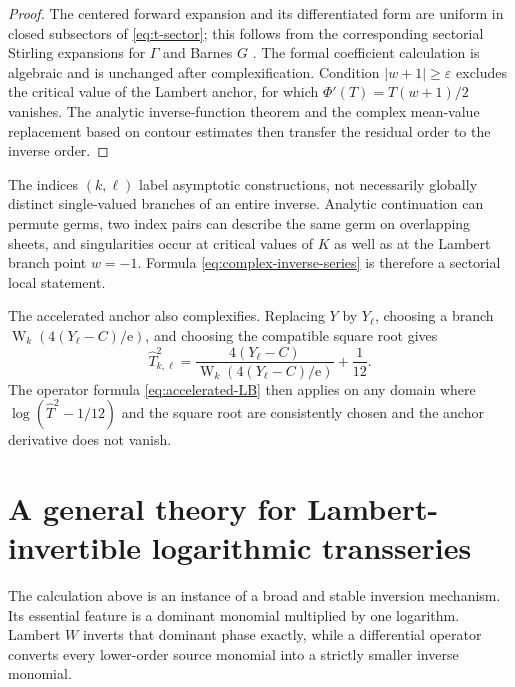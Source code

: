 \documentclass[11pt,oneside]{article}
\theoremstyle{plain}
\theoremstyle{definition}
\theoremstyle{remark}
\newcommand{\W}{\operatorname{W}}
\newcommand{\e}{\mathrm{e}}
\begin{document}
\begin{proof}
The centered forward expansion and its differentiated form are uniform in
closed subsectors of \cref{eq:t-sector}; this follows from the corresponding
sectorial Stirling expansions for \(\Gamma\) and Barnes \(G\)
\cite[\S5.11, \S5.17]{DLMF}.  The formal coefficient calculation is
algebraic and is unchanged after complexification.  Condition
\(|w+1|\ge\varepsilon\) excludes the critical value of the Lambert anchor,
for which \(\Phi'(T)=T(w+1)/2\) vanishes.  The analytic inverse-function
theorem and the complex mean-value replacement based on contour estimates
then transfer the residual order to the inverse order.
\end{proof}

\begin{warningbox}
The indices \((k,\ell)\) label asymptotic constructions, not necessarily
globally distinct single-valued branches of an entire inverse.  Analytic
continuation can permute germs, two index pairs can describe the same germ on
overlapping sheets, and singularities occur at critical values of \(K\) as
well as at the Lambert branch point \(w=-1\).  Formula
\cref{eq:complex-inverse-series} is therefore a sectorial local statement.
\end{warningbox}

The accelerated anchor also complexifies.  Replacing \(Y\) by \(Y_\ell\),
choosing a branch \(\W_k(4(Y_\ell-C)/\e)\), and choosing the compatible square
root gives
\begin{equation}
 \widehat T_{k,\ell}^2
 =\frac{4(Y_\ell-C)}{\W_k(4(Y_\ell-C)/\e)}+\frac1{12}.
 \label{eq:complex-accelerated}
\end{equation}
The operator formula \cref{eq:accelerated-LB} then applies on any domain where
\(\log(\widehat T^2-1/12)\) and the square root are consistently chosen and
the anchor derivative does not vanish.

\section{A general theory for Lambert-invertible logarithmic transseries}
\label{sec:general-theory}

The calculation above is an instance of a broad and stable inversion
mechanism.  Its essential feature is a dominant monomial multiplied by one
logarithm.  Lambert \(W\) inverts that dominant phase exactly, while a
differential operator converts every lower-order source monomial into a
strictly smaller inverse monomial.
\end{document}
